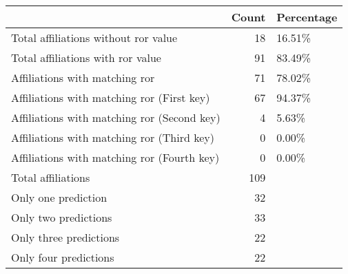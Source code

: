 \begin{tabular}{lrl}
\hline
                                             &   Count & Percentage   \\
\hline
 Total affiliations without ror value        &      18 & 16.51\%       \\
 Total affiliations with ror value           &      91 & 83.49\%       \\
 Affiliations with matching ror              &      71 & 78.02\%       \\
 Affiliations with matching ror (First key)  &      67 & 94.37\%       \\
 Affiliations with matching ror (Second key) &       4 & 5.63\%        \\
 Affiliations with matching ror (Third key)  &       0 & 0.00\%        \\
 Affiliations with matching ror (Fourth key) &       0 & 0.00\%        \\
 Total affiliations                          &     109 &              \\
 Only one prediction                         &      32 &              \\
 Only two predictions                        &      33 &              \\
 Only three predictions                      &      22 &              \\
 Only four predictions                       &      22 &              \\
\hline
\end{tabular}